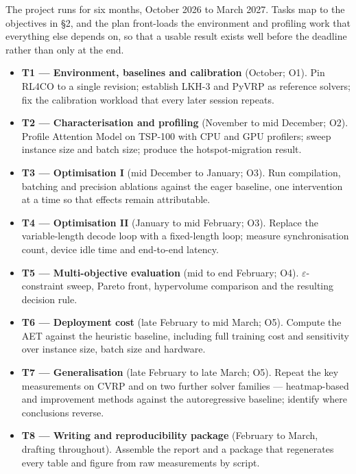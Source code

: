 \documentclass[11pt,a4paper]{article}
\begin{document}
The project runs for six months, October 2026 to March 2027. Tasks map to the
objectives in \S2, and the plan front-loads the environment and profiling work
that everything else depends on, so that a usable result exists well before the
deadline rather than only at the end.

\begin{itemize}[leftmargin=1.3em,topsep=0.5em]

\item \textbf{T1 --- Environment, baselines and calibration} (October; O1). Pin
RL4CO \citep{berto2023rl4co} to a single revision; establish LKH-3
\citep{helsgaun2017lkh3} and PyVRP \citep{wouda2024pyvrp} as reference solvers;
fix the calibration workload that every later session repeats.

\item \textbf{T2 --- Characterisation and profiling} (November to mid December;
O2). Profile Attention Model on TSP-100 with CPU and GPU profilers; sweep
instance size and batch size; produce the hotspot-migration result.

\item \textbf{T3 --- Optimisation I} (mid December to January; O3). Run
compilation, batching and precision ablations against the eager baseline, one
intervention at a time so that effects remain attributable.

\item \textbf{T4 --- Optimisation II} (January to mid February; O3). Replace the
variable-length decode loop with a fixed-length loop; measure synchronisation
count, device idle time and end-to-end latency.

\item \textbf{T5 --- Multi-objective evaluation} (mid to end February; O4).
$\varepsilon$-constraint sweep, Pareto front, hypervolume comparison and the
resulting decision rule.

\item \textbf{T6 --- Deployment cost} (late February to mid March; O5). Compute
the AET against the heuristic baseline, including full training cost and
sensitivity over instance size, batch size and hardware.

\item \textbf{T7 --- Generalisation} (late February to late March; O5). Repeat
the key measurements on CVRP and on two further solver families --- heatmap-based
and improvement methods against the autoregressive baseline; identify where
conclusions reverse.

\item \textbf{T8 --- Writing and reproducibility package} (February to March,
drafting throughout). Assemble the report and a package that regenerates every
table and figure from raw measurements by script.

\end{itemize}
\end{document}
